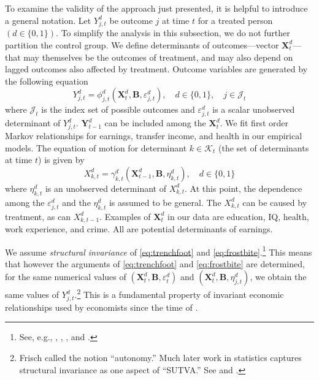 To examine the validity of the approach just presented, it is helpful to introduce a general notation. Let $Y^d_{j,t}$ be outcome $j$ at time $t$ for a treated person $(d\in\{0,1\})$. To simplify the analysis in this subsection, we do not further partition the control group. We define determinants of outcomes---vector $\bm{X}^d_t$---that may themselves be the outcomes of treatment, and may also depend on lagged outcomes also affected by treatment. Outcome variables are generated by the following equation
\begin{equation}\label{eq:trenchfoot}
Y^d_{j,t} = \phi^d_{j,t} (\bm{X}^d_t, \bm{B}, \varepsilon^d_{j,t}), \quad d \in \{0,1\}, \quad j \in \mathcal{J}_t
\end{equation}
where $\mathcal{J}_t$ is the index set of possible outcomes and $\varepsilon^d_{j,t}$ is a scalar unobserved determinant of $Y^d_{j,t}$. $\bm{Y}^d_{t-1}$ can be included among the $\bm{X}^d_{t}$. We fit first order Markov relationships for earnings, transfer income, and health in our empirical models. The equation of motion for determinant $k \in \mathcal{K}_t$ (the set of determinants at time $t$) is given by
\begin{equation}\label{eq:frostbite}
X^d_{k,t} = \gamma^d_{k,t} (\bm{X}^d_{t-1}, \bm{B}, \eta^d_{k,t}), \quad d \in \{0,1\}
\end{equation}
where $\eta^d_{k,t}$ is an unobserved determinant of $X^d_{k,t}$. At this point, the dependence among the $\varepsilon^d_{j,t}$ and the $\eta^d_{k,t}$ is assumed to be general. The $X^d_{k,t}$ can be caused by treatment, as can $X^d_{k,t-1}$. Examples of $\bm{X}^d_t$ in our data are education, IQ, health, work experience, and crime. All are potential determinants of earnings.

We assume \emph{structural invariance} of \eqref{eq:trenchfoot} and \eqref{eq:frostbite}.\footnote{See, e.g., \citet{Frisch_1938_autonomy}, \citet{Haavelmo_1943_Econometrica,Haavelmo_1944_Econometrica}, \citet{Hurwicz_1962_structural}, and \citet{Heckman_Pinto_2015_EconometTheory}.} This means that however the arguments of \eqref{eq:trenchfoot} and \eqref{eq:frostbite} are determined, for the same numerical values of $(\bm{X}^d_t, \bm{B}, \varepsilon^d_t)$ and $(\bm{X}^d_t, \bm{B}, \eta^d_{j,t})$, we obtain the same values of $Y^d_{j,t}$.\footnote{Frisch called the notion ``autonomy.'' Much later work in statistics captures structural invariance as one aspect of ``SUTVA.'' See \citet{Holland_1986_JASA} and \citet{Heckman_2008_ISR}.} This is a fundamental property of invariant economic relationships used by economists since the time of \citet{Frisch_1938_autonomy}.

